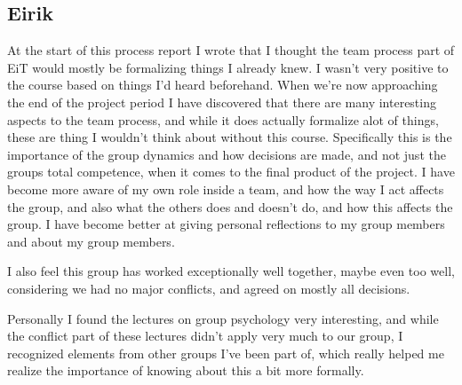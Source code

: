 \subsection{Eirik}
At the start of this process report I wrote that I thought the team process part of EiT would mostly be formalizing things I already knew. I wasn't very positive to the course based on things I'd heard beforehand. When we're now approaching the end of the project period I have discovered that there are many interesting aspects to the team process, and while it does actually formalize alot of things, these are thing I wouldn't think about without this course. Specifically this is the importance of the group dynamics and how decisions are made, and not just the groups total competence, when it comes to the final product of the project. I have become more aware of my own role inside a team, and how the way I act affects the group, and also what the others does and doesn't do, and how this affects the group. I have become better at giving personal reflections to my group members and about my group members.

I also feel this group has worked exceptionally well together, maybe even too well, considering we had no major conflicts, and agreed on mostly all decisions. 

Personally I found the lectures on group psychology very interesting, and while the conflict part of these lectures didn't apply very much to our group, I recognized elements from other groups I've been part of, which really helped me realize the importance of knowing about this a bit more formally.